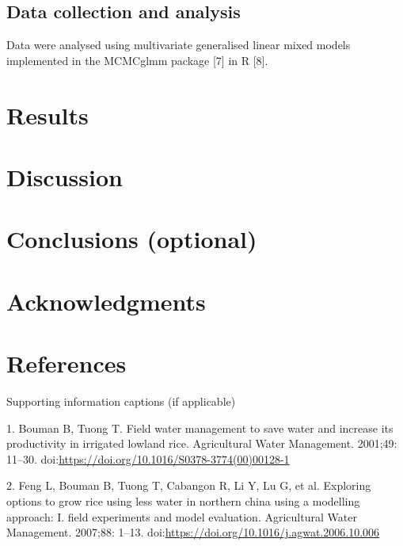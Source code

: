 \documentclass[10pt,letterpaper]{article}
\begin{document}
\subsection{Data collection and
analysis}\label{data-collection-and-analysis}

Data were analysed using multivariate generalised linear mixed models
implemented in the MCMCglmm package {[}7{]} in R {[}8{]}.

\section{Results}\label{results}

\section{Discussion}\label{discussion}

\section{Conclusions (optional)}\label{conclusions-optional}

\section{Acknowledgments}\label{acknowledgments}

\section*{References}\label{references}

Supporting information captions (if applicable)

\hypertarget{refs}{}
\hypertarget{ref-Bouman2001}{}
1. Bouman B, Tuong T. Field water management to save water and increase
its productivity in irrigated lowland rice. Agricultural Water
Management. 2001;49: 11--30.
doi:\href{https://doi.org/https://doi.org/10.1016/S0378-3774(00)00128-1}{https://doi.org/10.1016/S0378-3774(00)00128-1}

\hypertarget{ref-Feng2007}{}
2. Feng L, Bouman B, Tuong T, Cabangon R, Li Y, Lu G, et al. Exploring
options to grow rice using less water in northern china using a
modelling approach: I. field experiments and model evaluation.
Agricultural Water Management. 2007;88: 1--13.
doi:\href{https://doi.org/https://doi.org/10.1016/j.agwat.2006.10.006}{https://doi.org/10.1016/j.agwat.2006.10.006}
\end{document}
